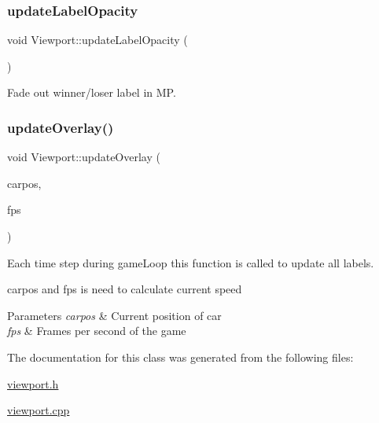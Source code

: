 \mbox{\label{class_viewport_ae0531bc2b8462937158f67e44b85f0fb}} 
\subsubsection{\texorpdfstring{updateLabelOpacity}{updateLabelOpacity}}
{\footnotesize\ttfamily void Viewport\+::update\+Label\+Opacity (\begin{DoxyParamCaption}{ }\end{DoxyParamCaption})\hspace{0.3cm}{\ttfamily [slot]}}



Fade out winner/loser label in MP. 

\mbox{\label{class_viewport_a11b053c166cbf98f4323bb7b7449b462}} 
\subsubsection{\texorpdfstring{updateOverlay()}{updateOverlay()}}
{\footnotesize\ttfamily void Viewport\+::update\+Overlay (\begin{DoxyParamCaption}\item[{Q\+PointF}]{carpos,  }\item[{int}]{fps }\end{DoxyParamCaption})}



Each time step during game\+Loop this function is called to update all labels. 

carpos and fps is need to calculate current speed 
\begin{DoxyParams}{Parameters}
{\em carpos} & Current position of car \\
\hline
{\em fps} & Frames per second of the game \\
\hline
\end{DoxyParams}


The documentation for this class was generated from the following files\+:\begin{DoxyCompactItemize}
\item 
\mbox{\hyperlink{viewport_8h}{viewport.\+h}}\item 
\mbox{\hyperlink{viewport_8cpp}{viewport.\+cpp}}\end{DoxyCompactItemize}
